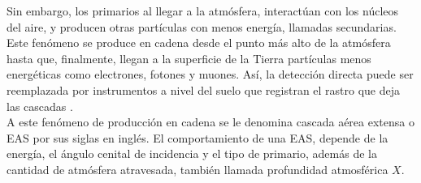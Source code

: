 Sin embargo, los primarios al llegar a la atmósfera, interactúan con los núcleos del aire, y producen otras partículas con menos energía, llamadas secundarias. Este fenómeno se produce en cadena desde el punto más alto de la atmósfera hasta que, finalmente, llegan a la superficie de la Tierra partículas menos energéticas como electrones, fotones y muones. Así, la detección directa puede ser reemplazada por instrumentos a nivel del suelo que registran el rastro que deja las cascadas \parencite{AsoreyLAGO}.\\ %

A este fenómeno de producción en cadena se le denomina cascada aérea extensa o EAS por sus siglas en inglés. El comportamiento de una EAS, depende de la energía, el ángulo cenital de incidencia y el tipo de primario, además de la cantidad de atmósfera atravesada, también llamada profundidad atmosférica $X$. \\

